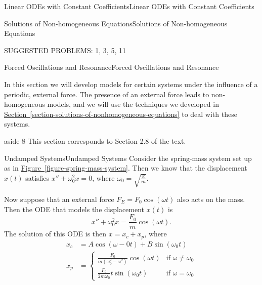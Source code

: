 \documentclass[10pt,]{book}
\numberwithin{equation}{section}
\newcommand{\amp}{&}
\begin{document}
\begin{chapterptx}{Linear ODEs with Constant Coefficients}{}{Linear ODEs with Constant Coefficients}{}{}
\begin{sectionptx}{Solutions of Non-homogeneous Equations}{}{Solutions of Non-homogeneous Equations}{}{}
\begin{conclusion}{}
\hypertarget{p-245}{}%
SUGGESTED PROBLEMS: 1, 3, 5, 11%
\end{conclusion}%
\end{sectionptx}
%
%
\typeout{************************************************}
\typeout{************************************************}
%
\begin{sectionptx}{Forced Oscillations and Resonance}{}{Forced Oscillations and Resonance}{}{}\label{section-forced-oscillations-and-resonance}
\begin{introduction}{}%
\hypertarget{p-246}{}%
In this section we will develop models for certain systems under the influence of a periodic, external force. The presence of an external force leads to non-homogeneous models, and we will use the techniques we developed in \hyperref[section-solutions-of-nonhomogeneous-equations]{Section~\ref{section-solutions-of-nonhomogeneous-equations}} to deal with these systems.%
\end{introduction}%
\begin{aside}{}{aside-8}%
\hypertarget{p-247}{}%
This section corresponds to Section 2.8 of the text.%
\end{aside}
%
%
\typeout{************************************************}
\typeout{************************************************}
%
\begin{subsectionptx}{Undamped Systems}{}{Undamped Systems}{}{}\label{subsection-undamped-systems}
\hypertarget{p-248}{}%
Consider the spring-mass system set up as in \hyperref[figure-spring-mass-system]{Figure~\ref{figure-spring-mass-system}}. Then we know that the displacement \(x(t)\) satisfies \(x'' + \omega_{0}^{2}x = 0\), where \(\omega_{0} = \sqrt{\frac{k}{m}}\).%
\par
\hypertarget{p-249}{}%
Now suppose that an external force \(F_{E} = F_{0}\cos(\omega t)\) also acts on the mass. Then the ODE that models the displacement \(x(t)\) is%
\begin{equation*}
x'' + \omega_{0}^{2}x = \frac{F_{0}}{m}\cos(\omega t).
\end{equation*}
The solution of this ODE is then \(x = x_{c} + x_{p}\), where%
\begin{align*}
x_{c} \amp= A\cos(\omega-{0}t) + B\sin(\omega_{0}t)\\
x_{p} \amp= \begin{cases} \frac{F_{0}}{m(\omega_{0}^{2} - \omega^{2})} \cos(\omega t) \amp\text{if }\omega\neq\omega_{0} \\ \frac{F_{0}}{2m\omega_{0}} t\sin(\omega_{0} t) \amp\text{if }\omega=\omega_{0} \end{cases}

\end{align*}
\end{subsectionptx}
\end{sectionptx}
\end{chapterptx}
\end{document}
